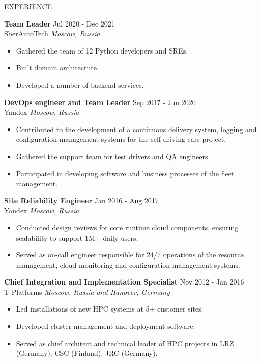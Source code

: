 \documentclass{resume} %
\begin{document}
\begin{rSection}{EXPERIENCE}
\begin{itemize}
\end{itemize}

\textbf{Team Leader} \hfill Jul 2020 - Dec 2021\\
SberAutoTech \hfill \textit{Moscow, Russia}
\begin{itemize}
   \itemsep -3pt {}
   \item Gathered the team of 12 Python developers and SREs.
   \item Built domain architecture.
   \item Developed a number of backend services.
\end{itemize}

\pagebreak

\textbf{DevOps engineer and Team Leader} \hfill Sep 2017 - Jun 2020\\
Yandex \hfill \textit{Moscow, Russia}
\begin{itemize}
   \itemsep -3pt {}
   \item Contributed to the development of a continuous delivery system, logging and configuration management systems for the self-driving cars project.
   \item Gathered the support team for test drivers and QA engineers.
   \item Participated in developing software and business processes of the fleet management.
\end{itemize}

\textbf{Site Reliability Engineer} \hfill Jan 2016 - Aug 2017\\
Yandex \hfill \textit{Moscow, Russia}
\begin{itemize}
   \itemsep -3pt {}
   \item Conducted design reviews for core runtime cloud components, ensuring scalability to support 1M+ daily users.
   \item Served as on-call engineer responsible for 24/7 operations of the resource management, cloud monitoring and configuration management systems.
\end{itemize}

\textbf{Chief Integration and Implementation Specialist} \hfill Nov 2012 - Jan 2016\\
T-Platforms \hfill \textit{Moscow, Russia and Hanover, Germany}
\begin{itemize}
   \itemsep -3pt {}
   \item Led installations of new HPC systems at 5+ customer sites.
   \item Developed cluster management and deployment software.
   \item Served as chief architect and technical leader of HPC projects in LRZ (Germany), CSC (Finland), JRC (Germany).
\end{itemize}


\end{rSection}
\end{document}
